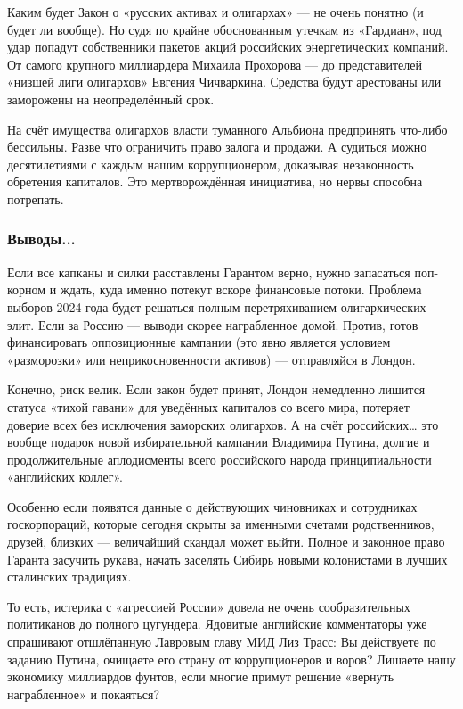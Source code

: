 Каким будет Закон о «русских активах и олигархах» — не очень понятно (и будет
ли вообще). Но судя по крайне обоснованным утечкам из «Гардиан», под удар
попадут собственники пакетов акций российских энергетических компаний. От
самого крупного миллиардера Михаила Прохорова — до представителей «низшей лиги
олигархов» Евгения Чичваркина. Средства будут арестованы или заморожены на
неопределённый срок.

На счёт имущества олигархов власти туманного Альбиона предпринять что-либо
бессильны. Разве что ограничить право залога и продажи. А судиться можно
десятилетиями с каждым нашим коррупционером, доказывая незаконность обретения
капиталов. Это мертворождённая инициатива, но нервы способна потрепать.

\subsubsection{Выводы...}

Если все капканы и силки расставлены Гарантом верно, нужно запасаться
поп-корном и ждать, куда именно потекут вскоре финансовые потоки. Проблема
выборов 2024 года будет решаться полным перетряхиванием олигархических элит.
Если за Россию — выводи скорее награбленное домой. Против, готов финансировать
оппозиционные кампании (это явно является условием «разморозки» или
неприкосновенности активов) — отправляйся в Лондон.


Конечно, риск велик. Если закон будет принят, Лондон немедленно лишится статуса
«тихой гавани» для уведённых капиталов со всего мира, потеряет доверие всех без
исключения заморских олигархов. А на счёт российских… это вообще подарок новой
избирательной кампании Владимира Путина, долгие и продолжительные аплодисменты
всего российского народа принципиальности «английских коллег».

Особенно если появятся данные о действующих чиновниках и сотрудниках
госкорпораций, которые сегодня скрыты за именными счетами родственников,
друзей, близких — величайший скандал может выйти. Полное и законное право
Гаранта засучить рукава, начать заселять Сибирь новыми колонистами в лучших
сталинских традициях.

То есть, истерика с «агрессией России» довела не очень сообразительных
политиканов до полного цугундера. Ядовитые английские комментаторы уже
спрашивают отшлёпанную Лавровым главу МИД Лиз Трасс: Вы действуете по заданию
Путина, очищаете его страну от коррупционеров и воров? Лишаете нашу экономику
миллиардов фунтов, если многие примут решение «вернуть награбленное» и
покаяться?

